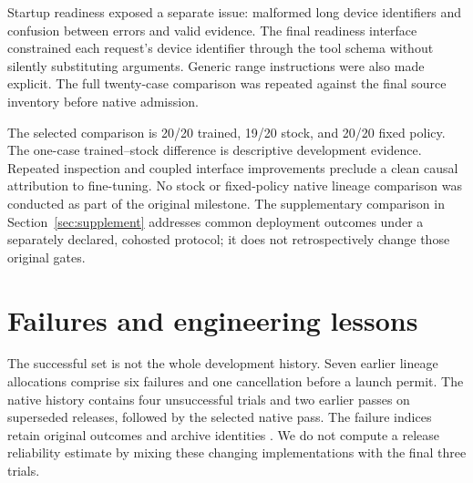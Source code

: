 \documentclass[11pt,letterpaper]{article}
\begin{document}
Startup readiness exposed a separate issue: malformed long device identifiers
and confusion between errors and valid evidence. The final readiness interface
constrained each request's device identifier through the tool schema without
silently substituting arguments. Generic range instructions were also made
explicit. The full twenty-case comparison was repeated against the final
source inventory before native admission.

The selected comparison is 20/20 trained, 19/20 stock, and 20/20 fixed policy.
The one-case trained--stock difference is descriptive development evidence.
Repeated inspection and coupled interface improvements preclude a clean causal
attribution to fine-tuning. No stock or fixed-policy native lineage comparison
was conducted as part of the original milestone. The supplementary comparison in Section~\ref{sec:supplement} addresses common deployment outcomes under a separately declared,
cohosted protocol; it does not retrospectively change those original gates.

\section{Failures and engineering lessons}
\label{sec:failures}

The successful set is not the whole development history. Seven earlier lineage
allocations comprise six failures and one cancellation before a launch permit.
The native history contains four unsuccessful trials and two earlier passes
on superseded releases, followed by the selected native pass. The failure
indices retain original outcomes and archive identities
\cite{failures,nativehistory}. We do not compute a release reliability estimate
by mixing these changing implementations with the final three trials.
\end{document}
